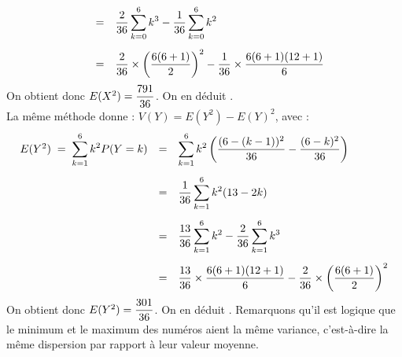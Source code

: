 \documentclass[a4paper, 11pt,reqno]{article}
\begin{document}
\begin{correction}
\begin{enumerate}
$$\begin{array}{rcl}
				                                                  & = & \ddp \frac{2}{36} \sum_{k=0}^6 k^3 - \frac{1}{36} \sum_{k=0}^6 k^2\vsec                               \\
				                                                  & = & \ddp \frac{2}{36} \times \left(\frac{6(6+1)}{2}\right)^2 - \frac{1}{36} \times \frac{6(6+1)(12+1)}{6}
			      \end{array}$$
		      On obtient donc $E(X^2)=\displaystyle \frac{791}{36}$. On en d\'eduit .\\
		      La m\^eme m\'ethode donne : $V(Y) = E(Y^2)-E(Y)^2$, avec :
		      $$\begin{array}{rcl}
				      E(Y^2) \; = \; \ddp \sum_{k=1}^6 k^2 P(Y=k) & = & \ddp  \sum_{k=1}^6 k^2 \left(\frac{(6-(k-1))^2}{36}-\frac{(6-k)^2}{36}\right)\vsec                        \\
				                                                  & = & \ddp   \frac{1}{36} \sum_{k=1}^6 k^2 (13-2k)\vsec                                                         \\
				                                                  & = & \ddp   \frac{13}{36} \sum_{k=1}^6 k^2 - \frac{2}{36} \sum_{k=1}^6 k^3\vsec                                \\
				                                                  & = & \ddp   \frac{13}{36} \times \frac{6(6+1)(12+1)}{6} - \frac{2}{36} \times  \left(\frac{6(6+1)}{2}\right)^2
			      \end{array}$$
		      On obtient donc $E(Y^2)=\displaystyle \frac{301}{36}$. On en d\'eduit . Remarquons qu'il est logique que le minimum et le maximum des num\'eros aient la m\^eme variance, c'est-\`a-dire la m\^eme dispersion par rapport \`a leur valeur moyenne.
	\end{enumerate}
\end{correction}
\end{document}
